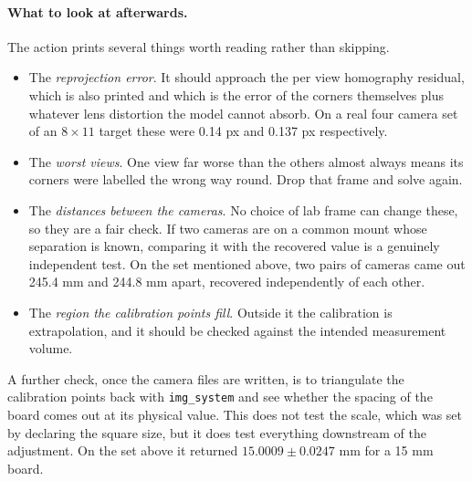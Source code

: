 \documentclass[10pt,a4paper]{article}
\begin{document}
\paragraph{What to look at afterwards.} The action prints several things worth reading rather than skipping.

\begin{itemize}
	\item The \emph{reprojection error}. It should approach the per view homography residual, which is also printed and which is the error of the corners themselves plus whatever lens distortion the model cannot absorb. On a real four camera set of an $8 \times 11$ target these were 0.14 px and 0.137 px respectively.

	\item The \emph{worst views}. One view far worse than the others almost always means its corners were labelled the wrong way round. Drop that frame and solve again.

	\item The \emph{distances between the cameras}. No choice of lab frame can change these, so they are a fair check. If two cameras are on a common mount whose separation is known, comparing it with the recovered value is a genuinely independent test. On the set mentioned above, two pairs of cameras came out 245.4 mm and 244.8 mm apart, recovered independently of each other.

	\item The \emph{region the calibration points fill}. Outside it the calibration is extrapolation, and it should be checked against the intended measurement volume.
\end{itemize}

A further check, once the camera files are written, is to triangulate the calibration points back with \texttt{img\_system} and see whether the spacing of the board comes out at its physical value. This does not test the scale, which was set by declaring the square size, but it does test everything downstream of the adjustment. On the set above it returned $15.0009 \pm 0.0247$ mm for a 15 mm board.
\end{document}
